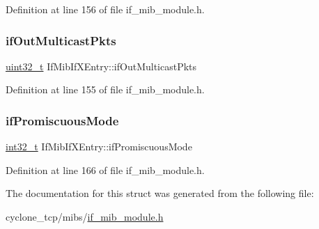 Definition at line 156 of file if\+\_\+mib\+\_\+module.\+h.

\mbox{\label{structIfMibIfXEntry_a59ddb219c11f99577537d7622e8e190c}} 
\subsubsection{\texorpdfstring{if\+Out\+Multicast\+Pkts}{ifOutMulticastPkts}}
{\footnotesize\ttfamily \hyperlink{stdint_8h_a435d1572bf3f880d55459d9805097f62}{uint32\+\_\+t} If\+Mib\+If\+X\+Entry\+::if\+Out\+Multicast\+Pkts}



Definition at line 155 of file if\+\_\+mib\+\_\+module.\+h.

\mbox{\label{structIfMibIfXEntry_a2d8b6d9eb34768f204a4ab8921798aa4}} 
\subsubsection{\texorpdfstring{if\+Promiscuous\+Mode}{ifPromiscuousMode}}
{\footnotesize\ttfamily \hyperlink{stdint_8h_ab1967d8591af1a4e48c37fd2b0f184d0}{int32\+\_\+t} If\+Mib\+If\+X\+Entry\+::if\+Promiscuous\+Mode}



Definition at line 166 of file if\+\_\+mib\+\_\+module.\+h.



The documentation for this struct was generated from the following file\+:\begin{DoxyCompactItemize}
\item 
cyclone\+\_\+tcp/mibs/\hyperlink{if__mib__module_8h}{if\+\_\+mib\+\_\+module.\+h}\end{DoxyCompactItemize}
